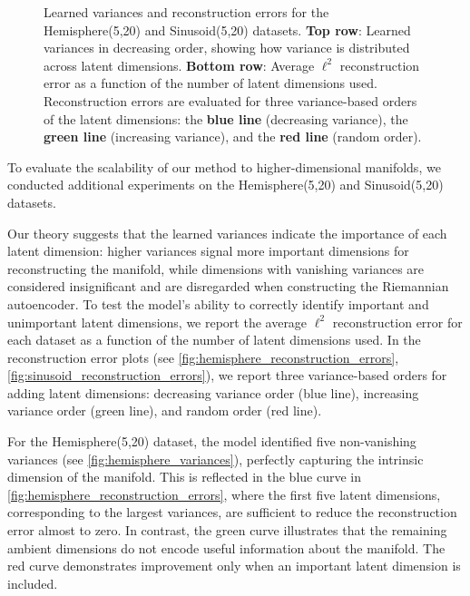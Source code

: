 \begin{figure}[h!]
    \caption{Learned variances and reconstruction errors for the Hemisphere(5,20) and Sinusoid(5,20) datasets. 
    \textbf{Top row}: Learned variances in decreasing order, showing how variance is distributed across latent dimensions. 
    \textbf{Bottom row}: Average $\ell^2$ reconstruction error as a function of the number of latent dimensions used. 
    Reconstruction errors are evaluated for three variance-based orders of the latent dimensions: the \textbf{blue line} (decreasing variance), the \textbf{green line} (increasing variance), and the \textbf{red line} (random order).}
    
    \label{fig:combined_plot}
\end{figure}




    To evaluate the scalability of our method to higher-dimensional manifolds, we conducted additional experiments on the Hemisphere(5,20) and Sinusoid(5,20) datasets. 
    
    Our theory suggests that the learned variances indicate the importance of each latent dimension: higher variances signal more important dimensions for reconstructing the manifold, while dimensions with vanishing variances are considered insignificant and are disregarded when constructing the Riemannian autoencoder. To test the model's ability to correctly identify important and unimportant latent dimensions, we report the average $\ell^2$ reconstruction error for each dataset as a function of the number of latent dimensions used. In the reconstruction error plots (see \ref{fig:hemisphere_reconstruction_errors},\ref{fig:sinusoid_reconstruction_errors}), we report three variance-based orders for adding latent dimensions: decreasing variance order (blue line), increasing variance order (green line), and random order (red line).
    
    For the Hemisphere(5,20) dataset, the model identified five non-vanishing variances (see \ref{fig:hemisphere_variances}), perfectly capturing the intrinsic dimension of the manifold. This is reflected in the blue curve in \ref{fig:hemisphere_reconstruction_errors}, where the first five latent dimensions, corresponding to the largest variances, are sufficient to reduce the reconstruction error almost to zero. In contrast, the green curve illustrates that the remaining ambient dimensions do not encode useful information about the manifold. The red curve demonstrates improvement only when an important latent dimension is included.
    
